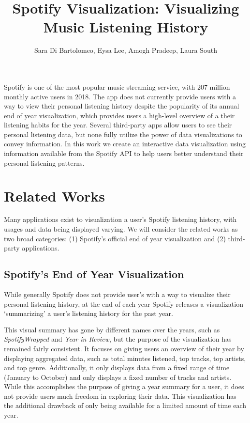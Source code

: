 \documentclass[journal]{vgtc}                %
\title{Spotify Visualization: Visualizing Music Listening History}
\author{Sara Di Bartolomeo, Eysa Lee, Amogh Pradeep, Laura South}
\begin{document}


\maketitle

Spotify is one of the most popular music streaming service, with 207 million monthly active users in 2018. The app does not currently provide users with a way to view their personal listening history despite the popularity of its annual end of year visualization, which provides users a high-level overview of a their listening habits for the year. Several third-party apps allow users to see their personal listening data, but none fully utilize the power of data visualizations to convey information. In this work we create an interactive data visualization using information available from the Spotify API to help users better understand their personal listening patterns.

\section{Related Works}
Many applications exist to visualization a user's Spotify listening history, with usages and data being displayed varying. We will consider the related works as two broad categories: (1) Spotify's official end of year visualization and (2) third-party applications.

\subsection{Spotify's End of Year Visualization}

While generally Spotify does not provide user's with a way to visualize their personal listening history, at the end of each year Spotify releases a visualization `summarizing' a user's listening history for the past year\cite{Spo18}.

This visual summary has gone by different names over the years, such as \emph{SpotifyWrapped} and \emph{Year in Review}, but the purpose of the visualization has remained fairly consistent. It focuses on giving users an overview of their year by displaying aggregated data, such as total minutes listened, top tracks, top artists, and top genre. Additionally, it only displays data from a fixed range of time (January to October) and only displays a fixed number of tracks and artists. While this accomplishes the purpose of giving a year summary for a user, it does not provide users much freedom in exploring their data. This visualization has the additional drawback of only being available for a limited amount of time each year.
\end{document}
